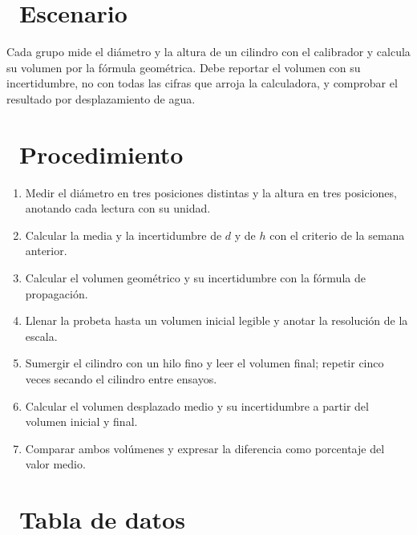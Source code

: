 \documentclass[11pt,a4paper]{article}
\newcommand{\iconotexto}[2]{\textcolor{cyanNeon}{\faIcon{#1}}~#2}
\begin{document}
\section{\iconotexto{flask}{Escenario}}

Cada grupo mide el diámetro y la altura de un cilindro con el calibrador y calcula su volumen por la fórmula geométrica. Debe reportar el volumen con su incertidumbre, no con todas las cifras que arroja la calculadora, y comprobar el resultado por desplazamiento de agua.

\section{\iconotexto{list-ol}{Procedimiento}}

\begin{enumerate}[leftmargin=1.4em,itemsep=2pt,topsep=3pt]
  \item Medir el diámetro en tres posiciones distintas y la altura en tres posiciones, anotando cada lectura con su unidad.
  \item Calcular la media y la incertidumbre de $d$ y de $h$ con el criterio de la semana anterior.
  \item Calcular el volumen geométrico y su incertidumbre con la fórmula de propagación.
  \item Llenar la probeta hasta un volumen inicial legible y anotar la resolución de la escala.
  \item Sumergir el cilindro con un hilo fino y leer el volumen final; repetir cinco veces secando el cilindro entre ensayos.
  \item Calcular el volumen desplazado medio y su incertidumbre a partir del volumen inicial y final.
  \item Comparar ambos volúmenes y expresar la diferencia como porcentaje del valor medio.
\end{enumerate}

\section{\iconotexto{table}{Tabla de datos}}
\end{document}
